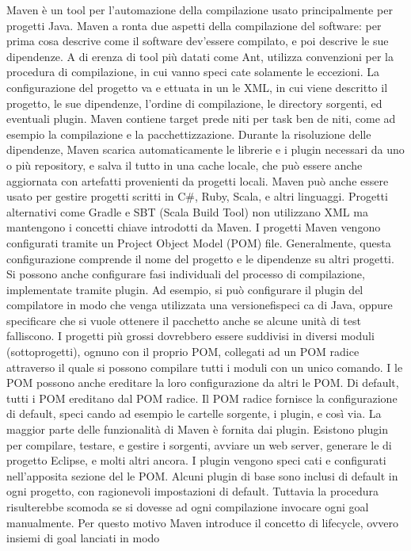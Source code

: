 Maven \`e un tool per l'automazione della compilazione usato principalmente per progetti Java.  Maven a ronta due aspetti della compilazione del software:
per prima cosa descrive come il software dev'essere compilato, e poi descrive le sue dipendenze.  A di erenza di tool pi\`u datati come Ant, utilizza convenzioni per la procedura di compilazione, in cui vanno speci cate solamente le eccezioni.  La configurazione del progetto va e ettuata in un  le XML, in cui viene descritto il progetto, le sue dipendenze, l'ordine di compilazione, le directory sorgenti, ed eventuali plugin.  Maven contiene target prede niti per task ben de niti, come ad esempio la compilazione e la pacchettizzazione.  Durante la risoluzione delle dipendenze, Maven scarica automaticamente le librerie e i plugin necessari da uno o pi\`u repository, e salva il tutto in una cache locale, che  pu\`o  essere  anche  aggiornata  con  artefatti  provenienti  da  progetti  locali.
Maven pu\`o anche essere usato per gestire progetti scritti in C#, Ruby, Scala, e altri linguaggi.  Progetti alternativi come Gradle e
SBT (Scala Build Tool) non utilizzano XML ma mantengono i concetti chiave
introdotti da Maven.
I  progetti  Maven  vengono  configurati  tramite  un  Project  Object  Model (POM) file.  Generalmente, questa configurazione comprende il nome del progetto e le dipendenze su altri progetti.  Si possono anche configurare fasi individuali del processo di compilazione, implementate tramite plugin.  Ad esempio, si pu\`o configurare il plugin del compilatore in modo che venga utilizzata una versionefispeci ca di Java, oppure specificare che si vuole ottenere il pacchetto anche se alcune unit\`a di test falliscono.  I progetti pi\`u grossi dovrebbero essere suddivisi in diversi moduli (sottoprogetti), ognuno con il proprio POM, collegati ad un POM radice attraverso il quale si possono compilare tutti i moduli con un unico comando.  I  le POM possono anche ereditare la loro configurazione da altri  le POM. Di default, tutti i POM ereditano dal POM radice.  Il POM radice fornisce la configurazione di default, speci cando ad esempio le cartelle sorgente, i plugin, e cos\`i via.
La maggior parte delle funzionalit\`a di Maven \`e fornita dai plugin.  Esistono plugin per compilare,  testare,  e gestire i sorgenti,  avviare un web server, generare  le di progetto Eclipse, e molti altri ancora. I plugin vengono speci cati e configurati nell'apposita sezione del  le POM. Alcuni plugin di base sono inclusi di default in ogni progetto, con ragionevoli impostazioni di default.  Tuttavia la procedura risulterebbe scomoda se si dovesse ad ogni compilazione invocare ogni goal manualmente.  Per questo motivo Maven introduce  il  concetto  di  lifecycle,  ovvero  insiemi  di  goal  lanciati  in  modo
